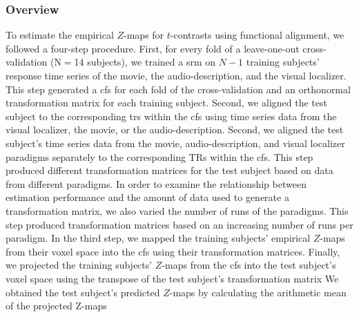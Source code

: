 \subsubsection{Overview}
%
To estimate the empirical $Z$-maps for $t$-contrasts using functional alignment,
we followed a four-step procedure.
First, for every fold of a leave-one-out cross-validation (N$=$14 subjects), we
trained a \ac{srm} on $N-1$ training subjects' response time series of the
movie, the audio-description, and the visual localizer.
This step generated a \ac{cfs} for each fold of the cross-validation and an
orthonormal transformation matrix for each training subject.
Second, we aligned the test subject to the corresponding \acp{tr} within the
\ac{cfs} using time series data from the visual localizer, the movie, or the
audio-description.
%
Second, we aligned the test subject's time series data from the movie,
audio-description, and visual localizer paradigms separately to the
corresponding TRs within the \ac{cfs}.
%
This step produced different transformation matrices for the test subject based
on data from different paradigms.
In order to examine the relationship between estimation performance and the
amount of data used to generate a transformation matrix, we also varied the
number of runs of the paradigms.
%
This step produced transformation matrices based on an increasing number of runs
per paradigm.
%
In the third step, we mapped the training subjects' empirical $Z$-maps from
their voxel space into the \ac{cfs} using their transformation matrices.
Finally, we projected the training subjects' $Z$-maps from the \ac{cfs} into the
test subject's voxel space using the transpose of the test subject's
transformation matrix
We obtained the test subject's predicted $Z$-maps by calculating the arithmetic
mean of the projected Z-maps



